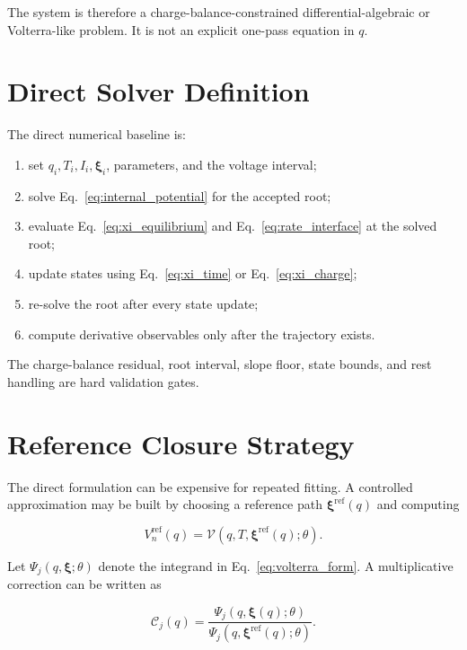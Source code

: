 \documentclass[11pt,a4paper]{article}
\begin{document}
The system is therefore a charge-balance-constrained differential-algebraic or Volterra-like problem. It is not an explicit one-pass equation in \(q\).

\section{Direct Solver Definition}

The direct numerical baseline is:

\begin{enumerate}[label=\arabic*.]
\item set \(q_i,T_i,I_i,\bm{\xi}_i\), parameters, and the voltage interval;
\item solve Eq.~\eqref{eq:internal_potential} for the accepted root;
\item evaluate Eq.~\eqref{eq:xi_equilibrium} and Eq.~\eqref{eq:rate_interface} at the solved root;
\item update states using Eq.~\eqref{eq:xi_time} or Eq.~\eqref{eq:xi_charge};
\item re-solve the root after every state update;
\item compute derivative observables only after the trajectory exists.
\end{enumerate}

The charge-balance residual, root interval, slope floor, state bounds, and rest handling are hard validation gates.

\section{Reference Closure Strategy}

The direct formulation can be expensive for repeated fitting. A controlled approximation may be built by choosing a reference path \(\bm{\xi}^{\mathrm{ref}}(q)\) and computing

\begin{equation}
V_n^{\mathrm{ref}}(q)
=
\mathcal{V}(q,T,\bm{\xi}^{\mathrm{ref}}(q);\theta).
\label{eq:reference_root}
\end{equation}

Let \(\Psi_j(q,\bm{\xi};\theta)\) denote the integrand in Eq.~\eqref{eq:volterra_form}. A multiplicative correction can be written as

\begin{equation}
\mathcal{C}_j(q)
=
\frac{\Psi_j(q,\bm{\xi}(q);\theta)}
{\Psi_j(q,\bm{\xi}^{\mathrm{ref}}(q);\theta)}.
\label{eq:closure_ratio}
\end{equation}
\end{document}
